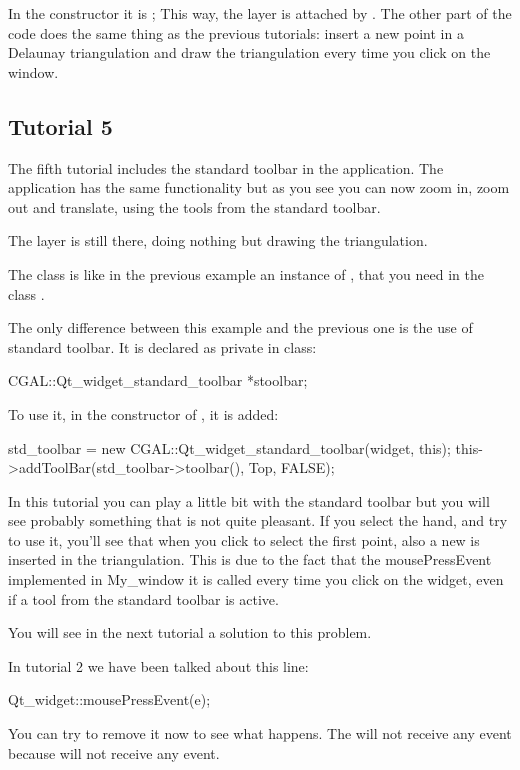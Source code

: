 In the constructor it is ; This way, the layer is
attached by . The other part of the code does the same
thing as the previous tutorials: insert a new point in a Delaunay
triangulation and draw the triangulation every time you click on the window.

\subsection*{Tutorial 5}

The fifth tutorial includes the standard toolbar in the
application. The application has the same functionality but as you
see you can now zoom in, zoom out and translate, using the tools from
the standard toolbar.

The layer is still there, doing nothing but drawing the triangulation.

The class  is like in the previous example an instance of
, that you need in the class .

The only difference between this example and the previous one is the
use of standard toolbar. It is declared as private in  class:
\begin{ccExampleCode}
CGAL::Qt_widget_standard_toolbar *stoolbar;
\end{ccExampleCode}
To use it, in the constructor of , it is added:
\begin{ccExampleCode}
std_toolbar = new CGAL::Qt_widget_standard_toolbar(widget, this);
this->addToolBar(std_toolbar->toolbar(), Top, FALSE);
\end{ccExampleCode}
In this tutorial you can play a little bit with the standard toolbar
but you will see probably something that is not quite pleasant. If you
select the hand, and try to use it, you'll see that when you click to
select the first point, also a new  is inserted in the
triangulation. This is due to the fact that the mousePressEvent
implemented in My\_window it is called every time you click on the
widget, even if a tool from the standard toolbar is active.

You will see in the next tutorial a solution to this problem.

\begin{ccAdvanced}
In tutorial 2 we have been talked about this line:
\begin{ccExampleCode}
Qt_widget::mousePressEvent(e);
\end{ccExampleCode}
You can try to remove it now to see what happens. The 
will not receive any event because  will not receive
any event.
\end{ccAdvanced}

